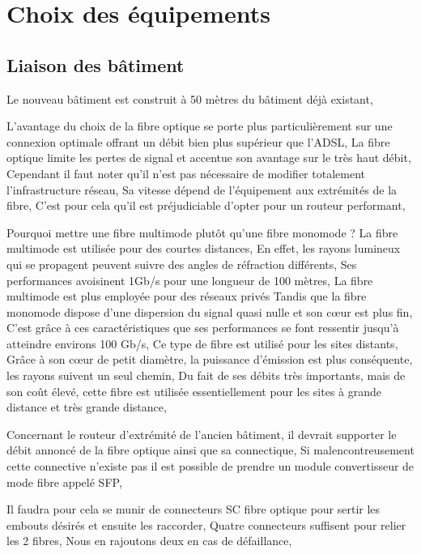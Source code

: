 \section{Choix des équipements}

%
%
\subsection{Liaison des bâtiment}

Le nouveau bâtiment est construit à 50 mètres du bâtiment déjà existant,

L'avantage du choix de la fibre optique se porte plus particulièrement sur une connexion optimale offrant un débit bien plus supérieur que l'ADSL,
La fibre optique limite les pertes de signal et accentue son avantage sur le très haut débit, Cependant il faut noter qu'il n'est pas nécessaire de modifier totalement l'infrastructure réseau, Sa vitesse dépend de l'équipement aux extrémités de la fibre, C'est pour cela qu'il est préjudiciable d'opter pour un routeur performant,

Pourquoi mettre une fibre multimode plutôt qu'une fibre monomode ?
La fibre multimode est utilisée pour des courtes distances, En effet, les rayons lumineux qui se propagent peuvent suivre des angles de réfraction différents, Ses performances avoisinent 1Gb/s pour une longueur de 100 mètres, La fibre multimode est plus employée pour des réseaux privés
Tandis que la fibre monomode dispose d'une dispersion du signal quasi nulle et son cœur est plus fin, C'est grâce à ces caractéristiques que ses performances se font ressentir jusqu'à atteindre environs 100 Gb/s, Ce type de fibre est utilisé pour les sites distants, Grâce à son cœur de petit diamètre, la puissance d'émission est plus conséquente, les rayons suivent un seul chemin, Du fait de ses débits très importants, mais de son coût élevé, cette fibre est utilisée essentiellement pour les sites à grande distance et très grande distance,

Concernant le routeur d'extrémité de l'ancien bâtiment, il devrait supporter le débit annoncé de la fibre optique ainsi que sa connectique,
Si malencontreusement cette connective n'existe pas il est possible de prendre un module convertisseur de mode fibre appelé SFP,

Il faudra pour cela se munir de connecteurs SC fibre optique pour sertir les embouts désirés et ensuite les raccorder, Quatre connecteurs suffisent pour relier les 2 fibres,  Nous en rajoutons deux en cas de défaillance,

